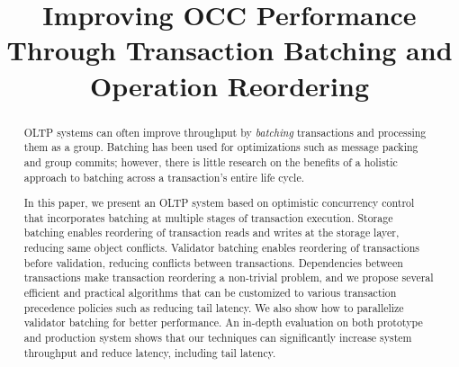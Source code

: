 \documentclass[sigconf]{acmart}
\begin{document}

\title{Improving OCC Performance Through Transaction Batching and Operation Reordering}

%
%

\begin{abstract}
	OLTP systems can often improve throughput by \emph{batching} transactions and processing them as a group. Batching has been used for optimizations such as message packing and group commits; however, there is little research on the benefits of a holistic approach to batching across a transaction's entire life cycle.
	
In this paper, we present an OLTP system based on optimistic concurrency control that incorporates batching at multiple stages of transaction execution. 
Storage batching enables reordering of transaction reads and writes at the storage layer, reducing same object conflicts. Validator batching enables reordering of transactions before validation, reducing conflicts between transactions. Dependencies between transactions make transaction reordering a non-trivial problem, and we propose several efficient and practical algorithms that can be customized to various transaction precedence policies such as reducing tail latency. We also show how to parallelize validator batching for better performance. 
An in-depth evaluation on both prototype and production system shows that our techniques can significantly increase system throughput and reduce latency, including tail latency. 
\end{abstract}

\maketitle



%
%







\end{document}
